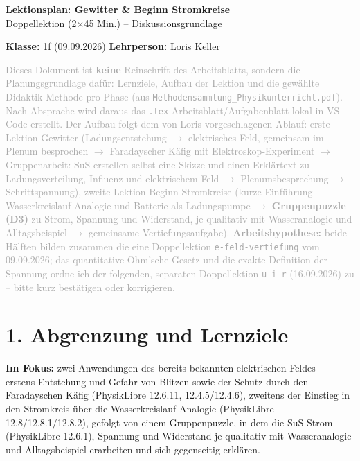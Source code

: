 \documentclass[11pt,a4paper]{article}
\begin{document}
\sloppy

\begin{center}
{\Huge\bfseries\color{titleblue}Lektionsplan: Gewitter \& Beginn Stromkreise}\\[0.4em]
{\large Doppellektion (2$\times$45 Min.) -- Diskussionsgrundlage}
\end{center}
\vspace{0.5em}

\noindent\textbf{Klasse:} 1f (09.09.2026)
\noindent\textbf{Lehrperson:} Loris Keller

\vspace{0.3em}
\noindent\textcolor{darkgray}{Dieses Dokument ist \textbf{keine} Reinschrift des Arbeitsblatts, sondern die
Planungsgrundlage dafür: Lernziele, Aufbau der Lektion und die gewählte
Didaktik-Methode pro Phase (aus \texttt{Methodensammlung\_Physikunterricht.pdf}).
Nach Absprache wird daraus das \texttt{.tex}-Arbeitsblatt/Aufgabenblatt lokal in
VS Code erstellt. Der Aufbau folgt dem von Loris vorgeschlagenen Ablauf: erste
Lektion Gewitter (Ladungsentstehung $\to$ elektrisches Feld, gemeinsam im
Plenum besprochen $\to$ Faradayscher Käfig mit Elektroskop-Experiment $\to$
Gruppenarbeit: SuS erstellen selbst eine Skizze und einen Erklärtext zu
Ladungsverteilung, Influenz und elektrischem Feld $\to$ Plenumsbesprechung
$\to$ Schrittspannung), zweite Lektion Beginn
Stromkreise (kurze Einführung Wasserkreislauf-Analogie und Batterie als
Ladungspumpe $\to$ \textbf{Gruppenpuzzle (D3)} zu Strom, Spannung und
Widerstand, je qualitativ mit Wasseranalogie und Alltagsbeispiel $\to$
gemeinsame Vertiefungsaufgabe). \textbf{Arbeitshypothese:} beide Hälften
bilden zusammen die eine Doppellektion \texttt{e-feld-vertiefung} vom
09.09.2026; das quantitative Ohm'sche Gesetz und die exakte Definition der
Spannung ordne ich der folgenden, separaten Doppellektion \texttt{u-i-r}
(16.09.2026) zu -- bitte kurz bestätigen oder korrigieren.}

\section*{1. Abgrenzung und Lernziele}

\textbf{Im Fokus:} zwei Anwendungen des bereits bekannten elektrischen
Feldes -- erstens Entstehung und Gefahr von Blitzen sowie der Schutz durch
den Faradayschen Käfig (PhysikLibre 12.6.11, 12.4.5/12.4.6), zweitens der
Einstieg in den Stromkreis über die Wasserkreislauf-Analogie (PhysikLibre
12.8/12.8.1/12.8.2), gefolgt von einem Gruppenpuzzle, in dem die SuS Strom
(PhysikLibre 12.6.1), Spannung und Widerstand je qualitativ mit
Wasseranalogie und Alltagsbeispiel erarbeiten und sich gegenseitig
erklären.
\end{document}
